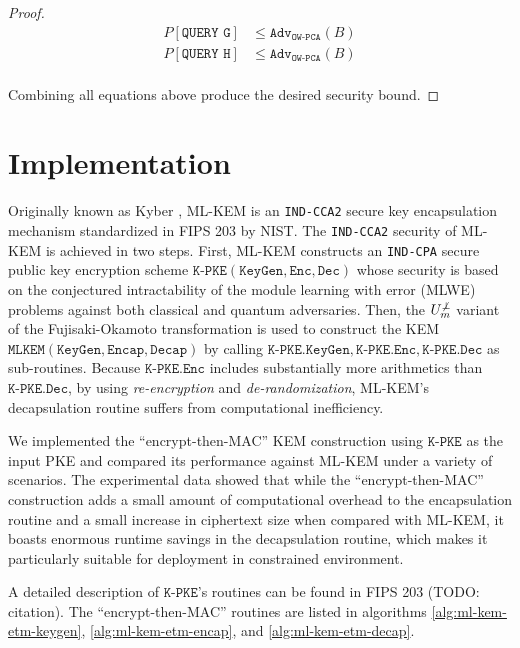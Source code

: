\documentclass[floatrow,journal=tches,submission]{iacrtrans}
\newcommand{\keygen}{\texttt{KeyGen}}
\newcommand{\encrypt}{\texttt{Enc}}
\newcommand{\decrypt}{\texttt{Dec}}
\newcommand{\encap}{\texttt{Encap}}
\newcommand{\decap}{\texttt{Decap}}
\newcommand{\adv}{\texttt{Adv}}
\begin{document}
\begin{proof}
    \begin{equation*}
        \begin{aligned}
            P\left[\texttt{QUERY G}\right] &\leq \adv_\texttt{OW-PCA}(B) \\
            P\left[\texttt{QUERY H}\right] &\leq \adv_\texttt{OW-PCA}(B) \\
        \end{aligned}
    \end{equation*}

    Combining all equations above produce the desired security bound.
\end{proof}

\section{Implementation}\label{sec:implementation}
Originally known as Kyber \cite{bos2018crystals}\cite{avanzi2019crystals}, ML-KEM is an \texttt{IND-CCA2} secure key encapsulation mechanism standardized in FIPS 203 by NIST. The \texttt{IND-CCA2} security of ML-KEM is achieved in two steps. First, ML-KEM constructs an \texttt{IND-CPA} secure public key encryption scheme $\texttt{K-PKE}(\keygen, \encrypt, \decrypt)$ whose security is based on the conjectured intractability of the module learning with error (MLWE) problems against both classical and quantum adversaries. Then, the $U^{\not\bot}_m$ variant of the Fujisaki-Okamoto transformation \cite{hofheinz2017modular} is used to construct the KEM $\texttt{MLKEM}(\keygen, \encap, \decap)$ by calling $\texttt{K-PKE}.\keygen, \texttt{K-PKE}.\encrypt, \texttt{K-PKE}.\decrypt$ as sub-routines. Because $\texttt{K-PKE}.\encrypt$ includes substantially more arithmetics than $\texttt{K-PKE}.\decrypt$, by using \textit{re-encryption} and \textit{de-randomization}, ML-KEM's decapsulation routine suffers from computational inefficiency.

We implemented the ``encrypt-then-MAC'' KEM construction using $\texttt{K-PKE}$ as the input PKE and compared its performance against ML-KEM under a variety of scenarios. The experimental data showed that while the ``encrypt-then-MAC'' construction adds a small amount of computational overhead to the encapsulation routine and a small increase in ciphertext size when compared with ML-KEM, it boasts enormous runtime savings in the decapsulation routine, which makes it particularly suitable for deployment in constrained environment.

A detailed description of $\texttt{K-PKE}$'s routines can be found in FIPS 203 (TODO: citation). The ``encrypt-then-MAC'' routines are listed in algorithms \ref{alg:ml-kem-etm-keygen}, \ref{alg:ml-kem-etm-encap}, and \ref{alg:ml-kem-etm-decap}.
\end{document}
